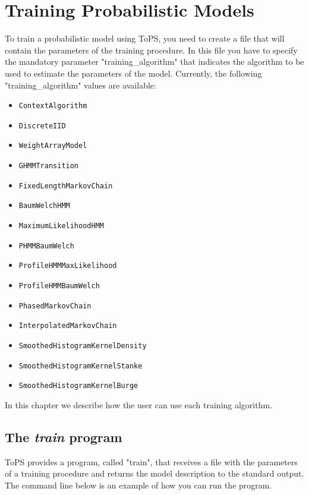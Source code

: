 \chapter{Training Probabilistic Models}

To train a probabilistic model using ToPS, you need to create a file that will contain the parameters of the training procedure. 
 In this file you have to specify the mandatory parameter "training\_algorithm"  that indicates the algorithm to be used to estimate the parameters of the model. Currently, the following "training\_algorithm"  values are available:

\begin{itemize}
\item \texttt{ContextAlgorithm}
\item \texttt{DiscreteIID}
\item \texttt{WeightArrayModel}
\item \texttt{GHMMTransition}
\item \texttt{FixedLengthMarkovChain}
\item \texttt{BaumWelchHMM}
\item \texttt{MaximumLikelihoodHMM}
\item \texttt{PHMMBaumWelch}
\item \texttt{ProfileHMMMaxLikelihood}
\item \texttt{ProfileHMMBaumWelch}
\item \texttt{PhasedMarkovChain}
\item \texttt{InterpolatedMarkovChain}
\item \texttt{SmoothedHistogramKernelDensity}
\item \texttt{SmoothedHistogramKernelStanke}
\item \texttt{SmoothedHistogramKernelBurge}
\end{itemize}

In this chapter we describe how the user can use each training algorithm.

\section{The \textit{train} program}


ToPS provides a program, called "train", that receives a file with the parameters of a training procedure and returns the model description to the standard output. The command line below is an example of how you can run the program.

\vspace{1em}

